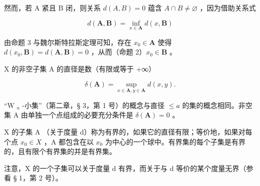 然而，若 A 紧且 B 闭，则关系 \(d(A, B) = 0\) 蕴含 \(A \cap B \neq \varnothing\) ，因为借助关系式

\[
d (\mathbf {A}, \mathbf {B}) = \inf _ {x \in \mathbf {A}} d (x, \mathbf {B})
\]

由命题 3 与魏尔斯特拉斯定理可知，存在 \(x_0 \in \mathbf{A}\) 使得 \(d(x_0, \mathbf{B}) = d(\mathbf{A}, \mathbf{B}) = 0\) ，从而（命题 2）\(x_0 \in \mathbf{B}\) 。

X 的非空子集 A 的直径是数（有限或等于 +∞）

\[
\delta (\mathbf {A}) = \sup _ {x \in \mathbf {A}, y \in \mathbf {A}} d (x, y).
\]

``W \(_{a}\) -小集''（第二章，§ 3，第 1 号）的概念与直径 \(\leqslant a\) 的集的概念相同。非空集 A 由单独一个点组成的必要充分条件是 \(\delta(\mathbf{A}) = 0\) 。

X 的子集 A （关于度量 d）称为有界的，如果它的直径有限；等价地，如果对每个点 \(x_{0} \in X\) ，A 都包含在以 \(x_{0}\) 为中心的一个球中。有界集的每个子集是有界的，且有限个有界集的并是有界集。

注意，X 的一个子集可以关于度量 d 有界，而关于与 d 等价的某个度量无界（参看 § 1，第 2 号）。

